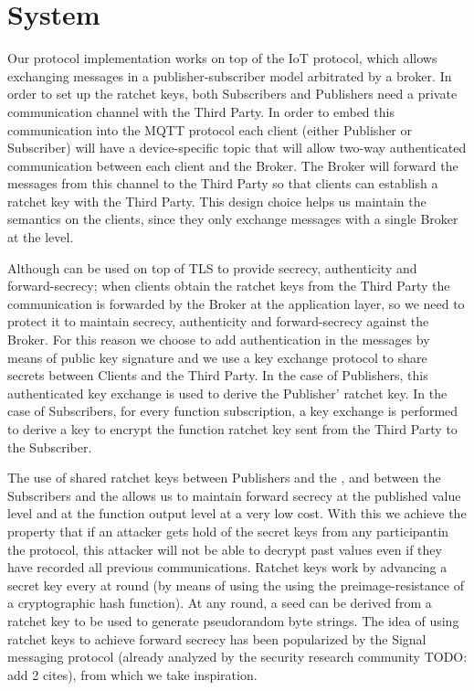 \section{System}
\label{sec:system}

Our protocol implementation works on top of the IoT \MQTT{} protocol, which
allows exchanging messages in a publisher-subscriber model arbitrated by a
broker.  In order to set up the ratchet keys, both Subscribers and Publishers
need a private communication channel with the Third Party.  In order to embed
this communication into the MQTT protocol each client (either Publisher or
Subscriber) will have a device-specific topic that will allow two-way
authenticated communication between each client and the Broker.  The Broker
will forward the messages from this channel to the Third Party so that clients
can establish a ratchet key with the Third Party.  This design choice helps us
maintain the \MQTT{} semantics on the clients, since they only exchange
messages with a single Broker at the \MQTT{} level.

Although \MQTT{} can be used on top of TLS to provide secrecy, authenticity and
forward-secrecy; when clients obtain the ratchet keys from the Third Party
the communication is forwarded by the Broker at the application layer, so we
need to protect it to maintain secrecy, authenticity and forward-secrecy
against the Broker.  For this reason we choose to add authentication in the
\MQTT{} messages by means of public key signature and we use a key exchange
protocol to share secrets between Clients and the Third Party.  In the case of
Publishers, this authenticated key exchange is used to derive the Publisher'
ratchet key.  In the case of Subscribers, for every function subscription, a
key exchange is performed to derive a key to encrypt the function ratchet key
sent from the Third Party to the Subscriber.

The use of shared ratchet keys between Publishers and the \garbler, and between
the Subscribers and the \garbler allows us to maintain forward secrecy at the
published value level and at the function output level at a very low cost.
With this we achieve the property that if an attacker gets hold of the secret
keys from any participantin the protocol, this attacker will not be able to
decrypt past values even if they have recorded all previous communications.
Ratchet keys work by advancing a secret key every at round (by means of using
the using the preimage-resistance of a cryptographic hash function).  At any
round, a seed can be derived from a ratchet key to be used to generate
pseudorandom byte strings.  The idea of using ratchet keys to achieve forward
secrecy has been popularized by the Signal messaging protocol (already analyzed
by the security research community TODO: add 2 cites), from which we take
inspiration.

